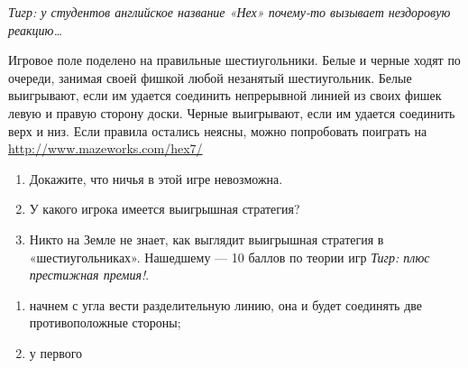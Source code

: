 \begin{problem}[«Шестиугольники»]\par

{\it Тигр: у студентов английское название «Нех» почему-то вызывает нездоровую реакцию\ldots }\par

Игровое поле поделено на правильные шестиугольники. Белые и черные ходят по очереди, занимая своей фишкой любой незанятый шестиугольник. Белые выигрывают, если им удается соединить непрерывной линией из своих фишек левую и правую сторону доски. Черные выигрывают, если им удается соединить верх и низ. Если правила остались неясны, можно попробовать поиграть на \url{http://www.mazeworks.com/hex7/}\par



\begin{enumerate}
\item 	Докажите, что ничья в этой игре невозможна.\par
\item 	У какого игрока имеется выигрышная стратегия?\par
\item 	Никто на Земле не знает, как выглядит выигрышная стратегия в «шестиугольниках». Нашедшему — 10 баллов по теории игр {\it Тигр: плюс престижная премия!}.\par
\end{enumerate}



\begin{sol}
\begin{enumerate}
\item начнем с угла вести разделительную линию, она и будет соединять две противоположные стороны;
\item у первого
\end{enumerate}
\end{sol}
\end{problem}










